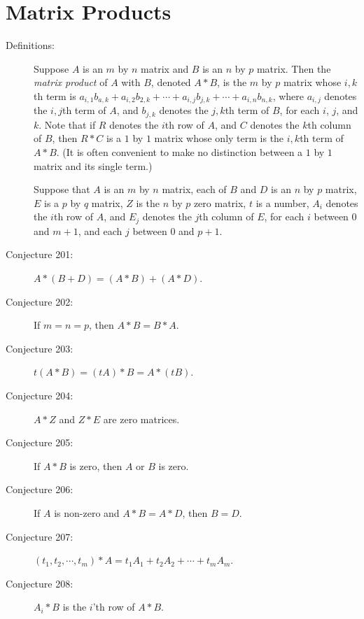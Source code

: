 \documentclass{article}
\begin{document}
\section{Matrix Products}

\begin{description}

  \item[Definitions:] Suppose $A$ is an $m$ by $n$ matrix and $B$ is an $n$ by $p$ matrix. Then the \emph{matrix product} of $A$ with $B$, denoted $A*B$, is the $m$ by $p$ matrix whose $i,k$th term is $a_{i,1}b_{a,k} + a_{i,2}b_{2,k} + \cdots + a_{i,j}b_{j,k} + \cdots + a_{i,n}b_{n,k}$, where $a_{i,j}$ denotes the $i,j$th term of $A$, and $b_{j,k}$ denotes the $j,k$th term of $B$, for each $i$, $j$, and $k$. Note that if $R$ denotes the $i$th row of $A$, and $C$ denotes the $k$th column of $B$, then $R * C$ is a $1$ by $1$ matrix whose only term is the $i,k$th term of $A * B$. (It is often convenient to make no distinction between a $1$ by $1$ matrix and its single term.)

  \item[] Suppose that $A$ is an $m$ by $n$ matrix, each of $B$ and $D$ is an $n$ by $p$ matrix, $E$ is a $p$ by $q$ matrix, $Z$ is the $n$ by $p$ zero matrix, $t$ is a number, $A_{i}$ denotes the $i$th row of $A$, and $E_{j}$ denotes the $j$th column of $E$, for each $i$ between $0$ and $m+1$, and each $j$ between $0$ and $p+1$.

  \item[Conjecture 201:] $A*(B+D) = (A*B) + (A*D)$.

  \item[Conjecture 202:] If $m=n=p$, then $A*B=B*A$.

  \item[Conjecture 203:] $t(A*B) = (tA)*B = A*(tB)$.

  \item[Conjecture 204:] $A*Z$ and $Z*E$ are zero matrices.

  \item[Conjecture 205:] If $A*B$ is zero, then $A$ or $B$ is zero.

  \item[Conjecture 206:] If $A$ is non-zero and $A*B=A*D$, then $B=D$.

  \item[Conjecture 207:] $(t_{1}, t_{2}, \cdots, t_{m})*A = t_{1}A_{1} + t_{2}A_{2} + \cdots + t_{m}A_{m}$.

  \item[Conjecture 208:] $A_{i}*B$ is the $i$'th row of $A*B$.


\end{description}
\end{document}

